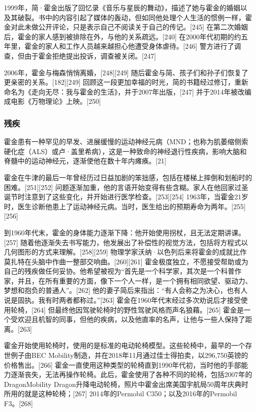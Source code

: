 1999年，简·霍金出版了回忆录《音乐与星辰的舞动》，描述了她与霍金的婚姻以及其破裂。书中的内容引起了媒体的轰动，但如同他处理个人生活的惯例一样，霍金对此未做公开评论，只是表示自己不阅读关于自己的传记。[245] 在第二次婚姻后，霍金的家人感到被排除在外，与他的关系疏远。[240] 在2000年代初期的约五年里，霍金的家人和工作人员越来越担心他遭受身体虐待。[246] 警方进行了调查，但由于霍金拒绝提出投诉，调查被关闭。[247]

2006年，霍金与梅森悄悄离婚，[248][249] 随后霍金与简、孩子们和孙子们恢复了更亲密的关系。[182][249] 回顾这一段更加幸福的时光，简的书籍经过修订，重新命名为《走向无尽：我与霍金的生活》，并于2007年出版，[247] 并于2014年被改编成电影《万物理论》上映。[250]
\subsubsection{残疾}
霍金患有一种罕见的早发、进展缓慢的运动神经元病（MND；也称为肌萎缩侧索硬化症（ALS）或卢·盖里希病），这是一种致命的神经退行性疾病，影响大脑和脊髓中的运动神经元，逐渐使他在数十年内瘫痪。[21]

霍金在牛津的最后一年曾经历过日益加剧的笨拙感，包括在楼梯上摔倒和划船时的困难。[251][252] 问题逐渐加重，他的言语开始变得有些含糊。家人在他回家过圣诞节时注意到了这些变化，并开始进行医学检查。[253][254] 1963年，当霍金21岁时，医生诊断他患上了运动神经元病。当时，医生给出的预期寿命为两年。[255][256]

到1960年代末，霍金的身体能力逐渐下降：他开始使用拐杖，且无法定期讲课。[257] 随着他逐渐失去书写能力，他发展出了补偿性的视觉方法，包括将方程式以几何图形的方式来理解。[258][259] 物理学家沃纳·以色列后来将霍金的成就比作莫扎特在头脑中作曲一整部交响曲。[260][261] 霍金极度独立，不愿接受帮助或为自己的残疾做任何妥协。他希望被视为“首先是一个科学家，其次是一个科普作家，并且，在所有重要的方面，像下一个人一样，是一个拥有相同欲望、驱动力、梦想和抱负的普通人”。[262] 他的妻子简后来指出：“有人会称之为决心，也有人说是固执。我有时两者都称过。”[263] 霍金在1960年代末经过多次劝说后才接受使用轮椅，[264] 但最终他因驾驶轮椅时的野性驾驶风格而声名狼藉。[265] 霍金是一个受欢迎且机智的同事，但他的疾病，以及他直率的名声，让他与一些人保持了距离。[263]

霍金开始使用轮椅时，使用的是标准的电动轮椅模型。这些轮椅中，最早的一个存世例子由BEC Mobility制造，并在2018年11月通过佳士得拍卖，以296,750英镑的价格售出。[266] 霍金一直使用这种类型的轮椅直到1990年代初，当时他的手部能力逐渐丧失，无法再操作轮椅。此后，霍金使用了各种不同的轮椅，包括2007年的DragonMobility Dragon升降电动轮椅，照片中霍金出席美国宇航局50周年庆典时所用的就是这种轮椅；[267] 2014年的Permobil C350；以及2016年的Permobil F3。[268]

